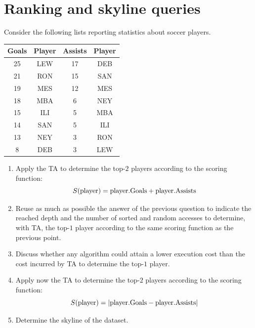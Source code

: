 \documentclass[12pt, a4paper]{report}
\newtheorem[style=M,bodystyle=\normalfont]{theorem}{Theorem}
\newtheorem[style=M,bodystyle=\normalfont]{corollary}{Corollary}
\newtheorem[style=M,bodystyle=\normalfont]{lemma}{Lemma}
\newtheorem[style=M,bodystyle=\normalfont]{definition}{Definition}
\begin{document}
    \section{Ranking and skyline queries}
        Consider the following lists reporting statistics about soccer players.
        \begin{table}[H]
            \centering
            \begin{tabular}{cc|cc}
            \hline
            \textbf{Goals} & \textbf{Player} & \textbf{Assists} & \textbf{Player} \\ \hline
            25             & LEW             & 17               & DEB             \\
            21             & RON             & 15               & SAN             \\
            19             & MES             & 12               & MES             \\
            18             & MBA             & 6                & NEY             \\
            15             & ILI             & 5                & MBA             \\
            14             & SAN             & 5                & ILI             \\
            13             & NEY             & 3                & RON             \\
            8              & DEB             & 3                & LEW             \\ \hline
            \end{tabular}
        \end{table}
        \begin{enumerate}
            \item Apply the TA to determine the top-$2$ players according to the scoring function: 
                \[S(\textnormal{player})=\textnormal{player.Goals}+\textnormal{player.Assists}\]
            \item Reuse as much as possible the answer of the previous question to indicate the 
                reached depth and the number of sorted and random accesses to determine, with TA,
                the top-$1$ player according to the same scoring function as the previous point.
            \item Discuss whether any algorithm could attain a lower execution cost than the cost 
                incurred by TA to determine the top-$1$ player. 
            \item Apply now the TA to determine the top-$2$ players according to the scoring function: 
                \[S(\textnormal{player})=\left\lvert \textnormal{player.Goals}-\textnormal{player.Assists} \right\rvert\]
            \item Determine the skyline of the dataset. 
        \end{enumerate}
\end{document}
